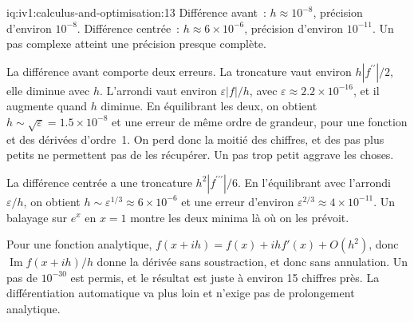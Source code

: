 \begin{solution}{iq:iv1:calculus-and-optimisation:13}
Différence avant~: $h \approx 10^{-8}$, précision d'environ $10^{-8}$. Différence centrée~: $h \approx 6 \times 10^{-6}$, précision d'environ $10^{-11}$. Un pas complexe atteint une précision presque complète.

La différence avant comporte deux erreurs. La troncature vaut environ $h|f^{\prime\prime}|/2$, elle diminue avec $h$. L'arrondi vaut environ $\varepsilon|f|/h$, avec $\varepsilon \approx 2.2 \times 10^{-16}$, et il augmente quand $h$ diminue. En équilibrant les deux, on obtient $h \sim \sqrt{\varepsilon} = 1.5 \times 10^{-8}$ et une erreur de même ordre de grandeur, pour une fonction et des dérivées d'ordre~1. On perd donc la moitié des chiffres, et des pas plus petits ne permettent pas de les récupérer. Un pas trop petit aggrave les choses.

La différence centrée a une troncature $h^2|f^{\prime\prime\prime}|/6$. En l'équilibrant avec l'arrondi $\varepsilon/h$, on obtient $h \sim \varepsilon^{1/3} \approx 6 \times 10^{-6}$ et une erreur d'environ $\varepsilon^{2/3} \approx 4 \times 10^{-11}$. Un balayage sur $e^x$ en $x = 1$ montre les deux minima là où on les prévoit.

Pour une fonction analytique, $f(x + ih) = f(x) + ihf'(x) + O(h^2)$, donc $\operatorname{Im} f(x + ih)/h$ donne la dérivée sans soustraction, et donc sans annulation. Un pas de $10^{-30}$ est permis, et le résultat est juste à environ 15 chiffres près. La différentiation automatique va plus loin et n'exige pas de prolongement analytique.



\end{solution}

